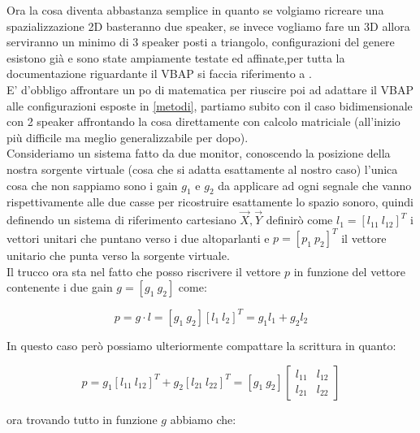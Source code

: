 \documentclass[12pt,a4paper]{report}
\begin{document}
Ora la cosa diventa abbastanza semplice in quanto se volgiamo ricreare una spazializzazione 2D basteranno due speaker, se invece vogliamo fare un 3D allora serviranno un minimo di 3 speaker posti a triangolo, configurazioni del genere esistono già e sono state ampiamente testate ed affinate,per tutta la documentazione riguardante il VBAP si faccia riferimento a \cite{vbap}.\\

E' d'obbligo affrontare un po di matematica per riuscire poi ad adattare il VBAP alle configurazioni esposte in \ref{metodi}, partiamo subito con il caso bidimensionale con 2 speaker affrontando la cosa direttamente con calcolo matriciale (all'inizio più difficile ma meglio generalizzabile per dopo).\\

Consideriamo un sistema fatto da due monitor, conoscendo la posizione della nostra sorgente virtuale (cosa che si adatta esattamente al nostro caso) l'unica cosa che non sappiamo sono i gain $g_1$ e $g_2$ da applicare ad ogni segnale che vanno rispettivamente alle due casse per ricostruire esattamente lo spazio sonoro, quindi definendo un sistema di riferimento cartesiano $\vec{X},\vec{Y}$ definirò come $l_1= {\left[ l_{11} \ l_{12} \right]}^T$ i vettori unitari che puntano verso i due altoparlanti e $p= {\left[ p_1 \ p_2 \right]}^T$ il vettore unitario che punta verso la sorgente virtuale.\\ 

Il trucco ora sta nel fatto che posso riscrivere il vettore $p$ in funzione del vettore contenente i due gain $g= \left[ g_1 \ g_2 \right]$ come:

\begin{equation}
p= g \cdot l = \left[g_1 \ g_2 \right] \left[l_1 \ l_2 \right]^T = g_1 l_1 + g_2 l_2
\label{eq:bbbb}
\end{equation}

In questo caso però possiamo ulteriormente compattare la scrittura in quanto:

\begin{equation}
p=g_1 {\left[ l_{11} \ l_{12} \right]}^T + g_2 {\left[ l_{21} \ l_{22} \right]}^T= \left[ g_1 \ g_2 \right] \left[\begin{matrix}
l_{11} & l_{12}\\ l_{21} & {l_22}
\end{matrix} \right]
\label{eq:cccc}
\end{equation}

ora trovando tutto in funzione $g$ abbiamo che:
\end{document}
